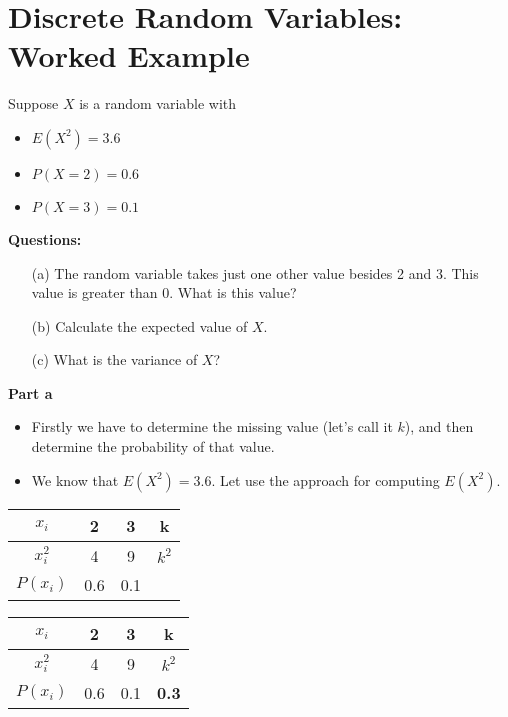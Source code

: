 \documentclass[a4paper,12pt]{article}
\begin{document}
\Large 
\section*{Discrete Random Variables: Worked Example}

Suppose $X$ is a random variable with 
\begin{itemize}
\item $E(X^2)=3.6$
\item $P(X=2)=0.6$
\item $P(X=3)=0.1$
\end{itemize}


\noindent \textbf{Questions:}
\begin{itemize}
\item[(a)] The random variable takes just one other value besides 2 and 3. This value is greater than 0. What is this value?
\item[(b)] Calculate the expected value of $X$.
\item[(c)] What is the variance of $X$?
\end{itemize}





\noindent \textbf{Part a}
\begin{itemize}
\item Firstly we have to determine the missing value (let's call it $k$), and then determine the probability of that value. 
\item We know that $E(X^2)=3.6$. Let use the approach for computing $E(X^2)$.

\end{itemize}

\begin{center}
\begin{tabular}{|c|c|c|c|}
\hline
$x_i$ & \phantom{sp}2\phantom{sp} & \phantom{sp}3\phantom{sp} & \phantom{sp}k\phantom{sp} \\ \hline
$x^2_i$ & 4 & 9 & $k^2$ \\ \hline
$P(x_i)$ & 0.6 &  0.1 &  \\ \hline 
\end{tabular}
\end{center}


\begin{center}
\begin{tabular}{|c|c|c|c|}
\hline
$x_i$ & \phantom{sp}2\phantom{sp} & \phantom{sp}3\phantom{sp} & \phantom{sp}k\phantom{sp} \\ \hline
$x^2_i$ & 4 & 9 & $k^2$ \\ \hline
$P(x_i)$ & 0.6 &  0.1 & \textbf{0.3} \\ \hline 
\end{tabular}
\end{center}
\end{document}
